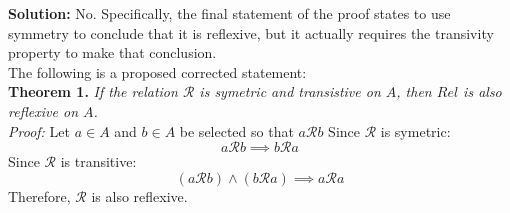 \documentclass[]{article}
\newcommand{\Rel}{\mathcal{R}}
\begin{document}
\textbf{Solution:}
No. Specifically, the final statement of the proof states to use symmetry to conclude that 
it is reflexive, but it actually requires the transivity property to make that conclusion.\\

The following is a proposed corrected statement:\\

\textbf{Theorem 1.}
\textit{If the relation $\Rel$ is symetric and transistive on $A$, then $Rel$ is also reflexive on $A$.}\\
\textit{Proof:}
Let $a \in A$ and $b \in A$ be selected so that $a \Rel b$
Since $\Rel$ is symetric: $$a \Rel b \implies b \Rel a$$
Since $\Rel$ is transitive: $$(a \Rel b) \land (b \Rel a) \implies a \Rel a$$
Therefore, $\Rel$ is also reflexive.
\end{document}

